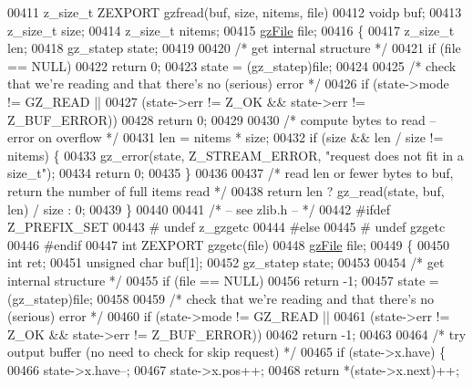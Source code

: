 \begin{DoxyCode}
00411 z\_size\_t ZEXPORT gzfread(buf, size, nitems, file)
00412     voidp buf;
00413     z\_size\_t size;
00414     z\_size\_t nitems;
00415     \hyperlink{structgz_file__s}{gzFile} file;
00416 \{
00417     z\_size\_t len;
00418     gz\_statep state;
00419 
00420     \textcolor{comment}{/* get internal structure */}
00421     \textcolor{keywordflow}{if} (file == NULL)
00422         \textcolor{keywordflow}{return} 0;
00423     state = (gz\_statep)file;
00424 
00425     \textcolor{comment}{/* check that we're reading and that there's no (serious) error */}
00426     \textcolor{keywordflow}{if} (state->mode != GZ\_READ ||
00427             (state->err != Z\_OK && state->err != Z\_BUF\_ERROR))
00428         \textcolor{keywordflow}{return} 0;
00429 
00430     \textcolor{comment}{/* compute bytes to read -- error on overflow */}
00431     len = nitems * size;
00432     \textcolor{keywordflow}{if} (size && len / size != nitems) \{
00433         gz\_error(state, Z\_STREAM\_ERROR, \textcolor{stringliteral}{"request does not fit in a size\_t"});
00434         \textcolor{keywordflow}{return} 0;
00435     \}
00436 
00437     \textcolor{comment}{/* read len or fewer bytes to buf, return the number of full items read */}
00438     \textcolor{keywordflow}{return} len ? gz\_read(state, buf, len) / size : 0;
00439 \}
00440 
00441 \textcolor{comment}{/* -- see zlib.h -- */}
00442 \textcolor{preprocessor}{#ifdef Z\_PREFIX\_SET}
00443 \textcolor{preprocessor}{#  undef z\_gzgetc}
00444 \textcolor{preprocessor}{#else}
00445 \textcolor{preprocessor}{#  undef gzgetc}
00446 \textcolor{preprocessor}{#endif}
00447 \textcolor{keywordtype}{int} ZEXPORT gzgetc(file)
00448     \hyperlink{structgz_file__s}{gzFile} file;
00449 \{
00450     \textcolor{keywordtype}{int} ret;
00451     \textcolor{keywordtype}{unsigned} \textcolor{keywordtype}{char} buf[1];
00452     gz\_statep state;
00453 
00454     \textcolor{comment}{/* get internal structure */}
00455     \textcolor{keywordflow}{if} (file == NULL)
00456         \textcolor{keywordflow}{return} -1;
00457     state = (gz\_statep)file;
00458 
00459     \textcolor{comment}{/* check that we're reading and that there's no (serious) error */}
00460     \textcolor{keywordflow}{if} (state->mode != GZ\_READ ||
00461         (state->err != Z\_OK && state->err != Z\_BUF\_ERROR))
00462         \textcolor{keywordflow}{return} -1;
00463 
00464     \textcolor{comment}{/* try output buffer (no need to check for skip request) */}
00465     \textcolor{keywordflow}{if} (state->x.have) \{
00466         state->x.have--;
00467         state->x.pos++;
00468         \textcolor{keywordflow}{return} *(state->x.next)++;

\end{DoxyCode}
